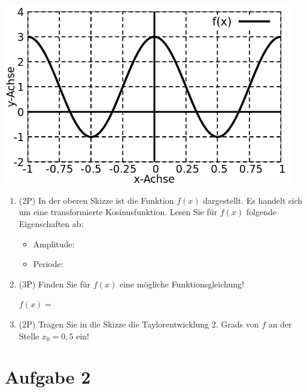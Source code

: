 \documentclass[12pt]{article}
\begin{document}
\begin{center}
\includegraphics[width=0.95\textwidth]{grid.png}
\end{center}

\begin{enumerate}[label=(\alph*)]
\item (2P) In der oberen Skizze ist die Funktion $f(x)$ dargestellt. Es handelt sich um eine transformierte Kosinusfunktion. Lesen Sie für $f(x)$ folgende Eigenschaften ab:
\begin{itemize}

\bigskip

\item Amplitude:

\bigskip
\bigskip

\item Periode:

\bigskip
\bigskip
\bigskip

\end{itemize}
\item (3P) Finden Sie für $f(x)$ eine mögliche Funktionsgleichung! \\

\bigskip

$f(x)=$

\bigskip
\bigskip
\bigskip

\item (2P) Tragen Sie in die Skizze die Taylorentwicklung 2. Grads von $f$ an der Stelle $x_0=0{,}5$ ein!

\end {enumerate}

\newpage
\section* {Aufgabe 2}
\end{document}
